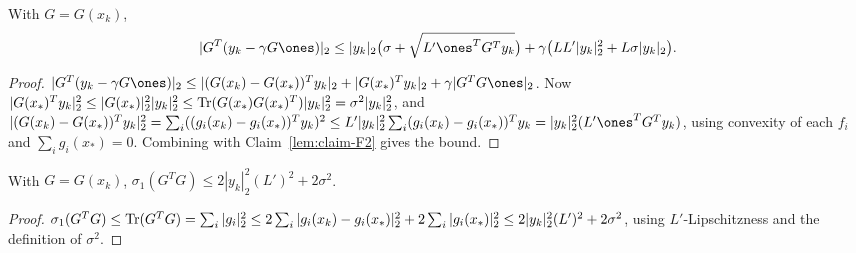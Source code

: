 \begin{lemma}
  \label{lem:claim-F3}
  With $G = G(x_k)$,
  \[
    |G^T(y_k - \gamma G\ones)|_2 \le |y_k|_2\big(\sigma + \sqrt{L'\ones^TG^Ty_k}\big)
      + \gamma\big(LL'|y_k|_2^2 + L\sigma|y_k|_2\big).
  \]
\end{lemma}
\begin{proof}
  $|G^T(y_k - \gamma G\ones)|_2 \le |(G(x_k) - G(x_*))^Ty_k|_2
   + |G(x_*)^Ty_k|_2 + \gamma|G^TG\ones|_2$. Now
  $|G(x_*)^Ty_k|_2^2 \le |G(x_*)|_2^2|y_k|_2^2 \le \operatorname{Tr}(G(x_*)G(x_*)^T)|y_k|_2^2
   = \sigma^2|y_k|_2^2$, and
  $|(G(x_k)-G(x_*))^Ty_k|_2^2 = \sum_i((g_i(x_k) - g_i(x_*))^Ty_k)^2
   \le L'|y_k|_2^2\sum_i(g_i(x_k) - g_i(x_*))^Ty_k = |y_k|_2^2(L'\ones^TG^Ty_k)$,
  using convexity of each $f_i$ and $\sum_i g_i(x_*) = 0$. Combining with
  Claim~\ref{lem:claim-F2} gives the bound.
\end{proof}

\begin{lemma}
  \label{lem:claim-F4}
  With $G = G(x_k)$, $\sigma_1(G^TG) \le 2|y_k|_2^2(L')^2 + 2\sigma^2$.
\end{lemma}
\begin{proof}
  $\sigma_1(G^TG) \le \operatorname{Tr}(G^TG) = \sum_i|g_i|_2^2
   \le 2\sum_i|g_i(x_k) - g_i(x_*)|_2^2 + 2\sum_i|g_i(x_*)|_2^2
   \le 2|y_k|_2^2(L')^2 + 2\sigma^2$, using $L'$-Lipschitzness and the definition
  of $\sigma^2$.
\end{proof}

